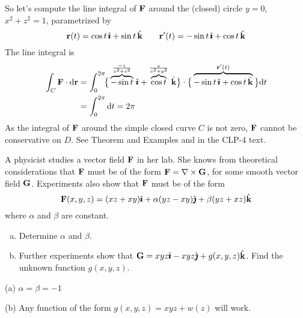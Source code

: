 \begin{solution}
So let's compute the line integral of $\mathbf{F}$ around the (closed) circle
$y=0$, $x^2+z^2=1$, parametrized by
\begin{equation*}
\mathbf{r}(t) = \cos t\,\hat{\pmb{\imath}} +\sin t\,\hat{\mathbf{k}}\qquad
\mathbf{r}'(t) = -\sin t\,\hat{\pmb{\imath}} +\cos t\,\hat{\mathbf{k}} 
\end{equation*}
The line integral is
\begin{align*}
\int_C \mathbf{F} \cdot \mathrm{d}\mathbf{r}
&=\int_0^{2\pi}\!\!\big\{
       \overbrace{-\sin t}^{\frac{-z}{x^2+z^2}}\,\hat{\pmb{\imath}}
      +\overbrace{\cos t}^{\frac{x}{x^2+y^2}}\,\hat{\mathbf{k}}\big\}
           \cdot
  \big\{\overbrace{-\sin t\,\hat{\pmb{\imath}} +\cos t\,\hat{\mathbf{k}}}^{\mathbf{r}'(t)}\big\}\mathrm{d}t \\
&= \int_0^{2\pi}\mathrm{d}t
=2\pi
\end{align*}
As the integral of $\mathbf{F}$ around the simple closed curve $C$
is not zero, $\mathbf{F}$ cannot be conservative on $D$.
See Theorem  and
Examples  and 
in the CLP-4 text. 

\end{solution}

\begin{question}[M317 2004A] %
A physicist studies a vector field $\mathbf{F}$ in her lab. She
knows from theoretical considerations that $\mathbf{F}$ must be of the form 
$\mathbf{F}=\nabla\times\mathbf{G}$, for some smooth vector field $\mathbf{G}$. Experiments 
also show that $\mathbf{F}$ must be of the form 
\begin{equation*}
\mathbf{F}(x,y,z)=(xz+xy)\hat{\pmb{\imath}}+\alpha(yz-xy)\hat{\pmb{\jmath}}+\beta(yz+xz)\hat{\mathbf{k}}
\end{equation*}
where $\alpha$ and $\beta$ are constant.
\begin{enumerate}[(a)]
\item
Determine $\alpha$ and $\beta$.

\item
Further experiments show that $\mathbf{G}=xyz\hat{\pmb{\imath}}-xyz\hat{\pmb{\jmath}}+g(x,y,z)\hat{\mathbf{k}}$.
Find the unknown function $g(x,y,z)$.
\end{enumerate}

\end{question}


\begin{answer} 
(a) $\alpha=\beta=-1$

(b)  Any function of the form $g(x,y,z)=xyz+w(z)$ will work.
\end{answer}

